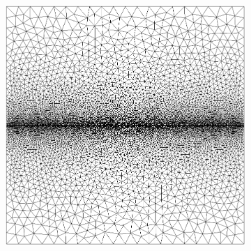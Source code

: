 \begin{figure}[htb!]
\begin{subfigure}[b]{0.19\textwidth}
    \caption{}
    \label{fig: Chapter4/mode1_notch_mesh}
  \end{subfigure}
  \hspace{0.05\textwidth}
  \begin{subfigure}[b]{0.19\textwidth}
    \centering
    \includegraphics[width=\textwidth]{Chapter4/figures/mode1_initial_mesh.png}
    \caption{}
    \label{fig: Chapter4/mode1_initial_mesh}
  \end{subfigure}


\end{figure}
